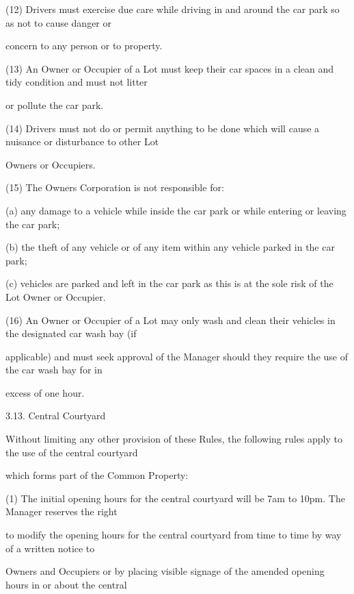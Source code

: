 \documentclass{article}
\begin{document}
{\fontsize{9.962}{1}(12) Drivers must exercise due care while driving in and around the car park so as not to cause danger or }

{\fontsize{10.02}{1}concern to any person or to property. }

{\fontsize{9.962}{1}(13) An Owner or Occupier of a Lot must keep their car spaces in a clean and tidy condition and must not litter }

{\fontsize{10.02}{1}or pollute the car park. }

{\fontsize{9.962}{1}(14) Drivers must not do or permit anything to be done which will cause a nuisance or disturbance to other Lot }

{\fontsize{10.02}{1}Owners or Occupiers. }

{\fontsize{9.962}{1}(15) The Owners Corporation is not responsible for: }

{\fontsize{9.962}{1}(a) any damage to a vehicle while inside the car park or while entering or leaving the car park; }

{\fontsize{9.962}{1}(b) the theft of any vehicle or of any item within any vehicle parked in the car park; }

{\fontsize{9.962}{1}(c) vehicles are parked and left in the car park as this is at the sole risk of the Lot Owner or Occupier. }

{\fontsize{9.962}{1}(16) An Owner or Occupier of a Lot may only wash and clean their vehicles in the designated car wash bay (if }

{\fontsize{10.02}{1}applicable) and must seek approval of the Manager should they require the use of the car wash bay for in }

{\fontsize{10.02}{1}excess of one hour. }

{\fontsize{9.99}{1}3.13. Central Courtyard }

{\fontsize{10.02}{1}Without limiting any other provision of these Rules, the following rules apply to the use of the central courtyard }

{\fontsize{10.02}{1}which forms part of the Common Property: }

{\fontsize{9.962}{1}(1) The initial opening hours for the central courtyard will be 7am to 10pm. The Manager reserves the right }

{\fontsize{10.02}{1}to modify the opening hours for the central courtyard from time to time by way of a written notice to }

{\fontsize{10.02}{1}Owners and Occupiers or by placing visible signage of the amended opening hours in or about the central }
\end{document}
